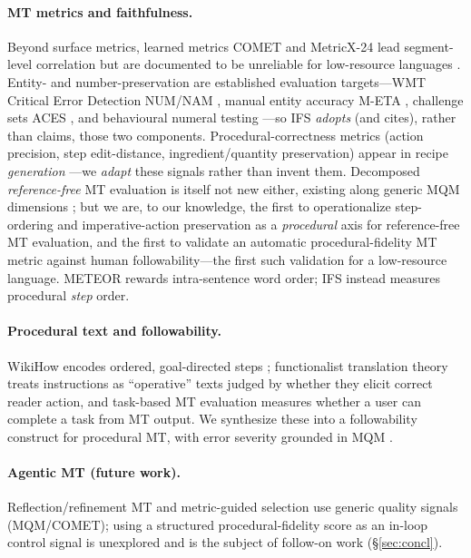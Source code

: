 \documentclass[11pt]{article}
\begin{document}
\paragraph{MT metrics and faithfulness.} Beyond surface metrics, learned metrics
COMET \citep{comet2020} and MetricX-24 \citep{metricx2024} lead segment-level correlation
but are documented to be unreliable for low-resource languages
\citep{falcao2024comet,africomet2024}. Entity- and number-preservation are established
evaluation targets---WMT Critical Error Detection NUM/NAM \citep{wmtced2022}, manual entity
accuracy M-ETA \citep{meta2024}, challenge sets ACES \citep{aces2022}, and behavioural numeral
testing \citep{wang2021numerals}---so IFS \emph{adopts} (and cites), rather than claims, those
two components. Procedural-correctness
metrics (action precision, step edit-distance, ingredient/quantity preservation) appear in
recipe \emph{generation} \citep{recipegen2025}---we \emph{adapt} these signals rather than
invent them. Decomposed \emph{reference-free} MT evaluation is itself not new either, existing
along generic MQM dimensions \citep{park2024multidim}; but we are, to our knowledge, the first to
operationalize step-ordering and imperative-action preservation as a \emph{procedural} axis for
reference-free MT evaluation, and the first to validate an automatic procedural-fidelity MT
metric against human followability---the first such validation for a low-resource language. METEOR \citep{meteor2005} rewards
intra-sentence word order; IFS instead measures procedural \emph{step} order.

\paragraph{Procedural text and followability.} WikiHow encodes ordered, goal-directed steps
\citep{wikilingua2020}; functionalist translation theory \citep{reissvermeer1984} treats
instructions as ``operative'' texts judged by whether they elicit correct reader action,
and task-based MT evaluation \citep{gale_taskbased} measures whether a user can complete a
task from MT output. We synthesize these into a followability construct for procedural MT,
with error severity grounded in MQM \citep{mqm2021}.

\paragraph{Agentic MT (future work).} Reflection/refinement MT \citep{selfrefine2023,
ng2024transagent,tear2025,llmrefine2024} and metric-guided selection \citep{maps2024} use
generic quality signals (MQM/COMET); using a structured procedural-fidelity score as an
in-loop control signal is unexplored and is the subject of follow-on work (\S\ref{sec:concl}).
\end{document}

